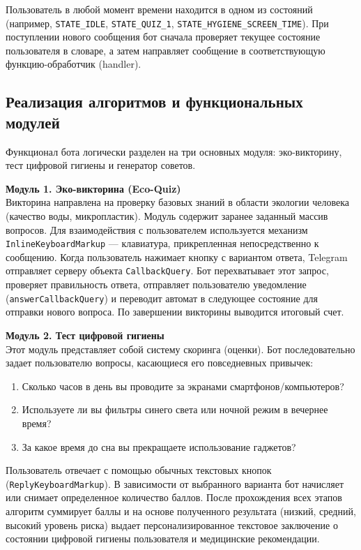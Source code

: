 Пользователь в любой момент времени находится в одном из состояний (например, \texttt{STATE\_IDLE}, \texttt{STATE\_QUIZ\_1}, \texttt{STATE\_HYGIENE\_SCREEN\_TIME}). При поступлении нового сообщения бот сначала проверяет текущее состояние пользователя в словаре, а затем направляет сообщение в соответствующую функцию-обработчик (handler). 

\subsection{Реализация алгоритмов и функциональных модулей}
Функционал бота логически разделен на три основных модуля: эко-викторину, тест цифровой гигиены и генератор советов.

\textbf{Модуль 1. Эко-викторина (Eco-Quiz)}\\
Викторина направлена на проверку базовых знаний в области экологии человека (качество воды, микропластик). Модуль содержит заранее заданный массив вопросов. Для взаимодействия с пользователем используется механизм \texttt{InlineKeyboardMarkup} — клавиатура, прикрепленная непосредственно к сообщению.
Когда пользователь нажимает кнопку с вариантом ответа, Telegram отправляет серверу объекта \texttt{CallbackQuery}. Бот перехватывает этот запрос, проверяет правильность ответа, отправляет пользователю уведомление (\texttt{answerCallbackQuery}) и переводит автомат в следующее состояние для отправки нового вопроса. По завершении викторины выводится итоговый счет.

\textbf{Модуль 2. Тест цифровой гигиены}\\
Этот модуль представляет собой систему скоринга (оценки). Бот последовательно задает пользователю вопросы, касающиеся его повседневных привычек:
\begin{enumerate}
    \item Сколько часов в день вы проводите за экранами смартфонов/компьютеров?
    \item Используете ли вы фильтры синего света или ночной режим в вечернее время?
    \item За какое время до сна вы прекращаете использование гаджетов?
\end{enumerate}
Пользователь отвечает с помощью обычных текстовых кнопок (\texttt{ReplyKeyboardMarkup}). В зависимости от выбранного варианта бот начисляет или снимает определенное количество баллов. После прохождения всех этапов алгоритм суммирует баллы и на основе полученного результата (низкий, средний, высокий уровень риска) выдает персонализированное текстовое заключение о состоянии цифровой гигиены пользователя и медицинские рекомендации.

